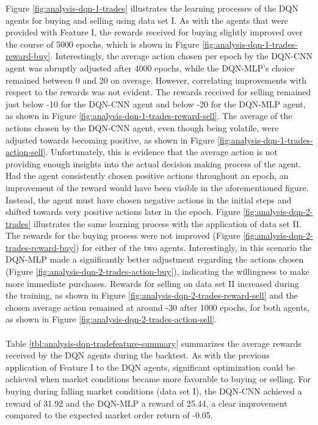 Figure \ref{fig:analysis-dqn-1-trades} illustrates the learning processes of the DQN agents for buying and selling using data set I.
As with the agents that were provided with Feature I, the rewards received for buying slightly improved over the course of 5000 epochs, which is shown in Figure \ref{fig:analysis-dqn-1-trades-reward-buy}.
Interestingly, the average action chosen per epoch by the DQN-CNN agent was abruptly adjusted after 4000 epochs, while the DQN-MLP's choice remained between 0 and 20 on average.
However, correlating improvements with respect to the rewards was not evident.
The rewards received for selling remained just below -10 for the DQN-CNN agent and below -20 for the DQN-MLP agent, as shown in Figure \ref{fig:analysis-dqn-1-trades-reward-sell}.
The average of the actions chosen by the DQN-CNN agent, even though being volatile, were adjusted towards becoming positive, as shown in Figure \ref{fig:analysis-dqn-1-trades-action-sell}.
Unfortunately, this is evidence that the average action is not providing enough insights into the actual decision making process of the agent.
Had the agent consistently chosen positive actions throughout an epoch, an improvement of the reward would have been visible in the aforementioned figure.
Instead, the agent must have chosen negative actions in the initial steps and shifted towards very positive actions later in the epoch.
Figure \ref{fig:analysis-dqn-2-trades} illustrates the same learning process with the application of data set II.
The rewards for the buying process were not improved (Figure \ref{fig:analysis-dqn-2-trades-reward-buy}) for either of the two agents.
Interestingly, in this scenario the DQN-MLP made a significantly better adjustment regarding the actions chosen (Figure \ref{fig:analysis-dqn-2-trades-action-buy}), indicating the willingness to make more immediate purchases.
Rewards for selling on data set II increased during the training, as shown in Figure \ref{fig:analysis-dqn-2-trades-reward-sell} and the chosen average action remained at around -30 after 1000 epochs, for both agents, as shown in Figure \ref{fig:analysis-dqn-2-trades-action-sell}.
\\
\\
Table \ref{tbl:analysis-dqn-tradefeature-summary} summarizes the average rewards received by the DQN agents during the backtest.
As with the previous application of Feature I to the DQN agents, significant optimization could be achieved when market conditions became more favorable to buying or selling.
For buying during falling market conditions (data set I), the DQN-CNN achieved a reward of 31.92 and the DQN-MLP a reward of 25.44, a clear improvement compared to the expected market order return of -0.05.
